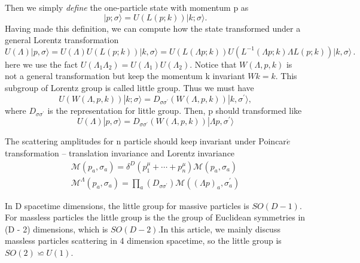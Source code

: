 \documentclass[12pt]{article}
\numberwithin{equation}{section}
\newcommand{\aket}[1]{|#1\rangle}
\begin{document}
Then we simply \textit{define} the one-particle state with momentum p as 
\begin{equation}
    \aket{p;\sigma}=U(L(p;k))\aket{k;\sigma}.
\end{equation}
Having made this definition, we can compute how the state transformed under a general Lorentz transformation
\begin{equation}
    U(\Lambda)|p,\sigma\rangle = U(\Lambda) U(L(p;k))|k,\sigma \rangle = U(L(\Lambda p;k)) U(L^{-1}(\Lambda p;k) \Lambda L(p;k)) |k,\sigma \rangle\,.
\end{equation}
here we use the fact $U(\Lambda_1\Lambda_2)=U(\Lambda_1)U(\Lambda_2)$.
Notice that $W(\Lambda,p,k)$ is not a general transformation but keep the momentum k invariant $Wk=k$. This subgroup of Lorentz group is called little group.
Thus we must have 
\begin{equation}
    U(W(\Lambda,p,k))\aket{k;\sigma}=D_{\sigma\sigma^{'}}(W(\Lambda,p,k))\aket{k,\sigma^{'}},
\end{equation} 
where $D_{\sigma\sigma^{'}}$ is the representation for little group. Then, p should transformed like
\begin{equation}
     U(\Lambda)|p,\sigma\rangle=D_{\sigma\sigma^{'}}(W(\Lambda,p,k))\aket{\Lambda p,\sigma^{'}}
\end{equation}

The scattering amplitudes for n particle should keep invariant under Poincar$\acute{e}$ transformation -- translation invariance and Lorentz invariance
\begin{gather}
    \mathcal{M}(p_a,\sigma_a)=\delta^D(p_1^\mu+\cdots +p_n^\mu)\mathcal{M}(p_a,\sigma_a)\\
    \mathcal{M}^\Lambda(p_a,\sigma_a)=\prod_{a}(D_{\sigma\sigma^{'}})\mathcal{M}((\Lambda p)_a,\sigma_a^{'})
    \label{2.43}
\end{gather}

In D spacetime dimensions, the little group for massive particles is $SO(D-1)$. For massless
particles the little group is the the group of Euclidean symmetries in (D - 2) dimensions, which
is $SO(D-2)$.In this article, we mainly discuss massless particles scattering in 4 dimension spacetime, so the little group is $SO(2)\backsimeq U(1)$.
\end{document}
